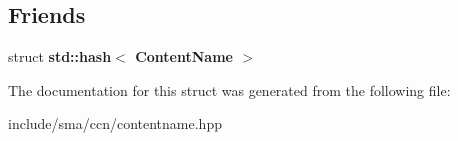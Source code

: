 \subsection*{Friends}
\begin{DoxyCompactItemize}
\item 
\hypertarget{structsma_1_1ContentName_a1bfafb029481f0499f839a5361adada2}{struct {\bfseries std\-::hash$<$ Content\-Name $>$}}\label{structsma_1_1ContentName_a1bfafb029481f0499f839a5361adada2}

\end{DoxyCompactItemize}


The documentation for this struct was generated from the following file\-:\begin{DoxyCompactItemize}
\item 
include/sma/ccn/contentname.\-hpp\end{DoxyCompactItemize}
